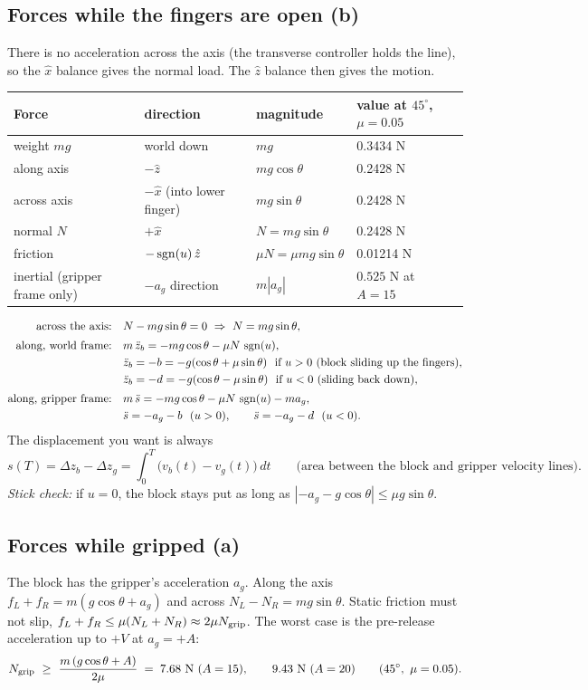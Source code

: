 \subsection*{Forces while the fingers are open (b)}
There is no acceleration across the axis (the transverse controller holds the line), so the $\hat x$ balance gives
the normal load. The $\hat z$ balance then gives the motion.
\begin{center}
\small
\begin{tabular}{llll}
\toprule
Force & direction & magnitude & value at $45^\circ$, $\mu=0.05$\\
\midrule
weight $mg$ & world down & $mg$ & 0.3434 N\\
\quad along axis & $-\hat z$ & $mg\cos\theta$ & 0.2428 N\\
\quad across axis & $-\hat x$ (into lower finger) & $mg\sin\theta$ & 0.2428 N\\
normal $N$ & $+\hat x$ & $N=mg\sin\theta$ & 0.2428 N\\
friction & $-\operatorname{sgn}(u)\,\hat z$ & $\mu N=\mu mg\sin\theta$ & 0.01214 N\\
inertial (gripper frame only) & $-a_g$ direction & $m|a_g|$ & $0.525$ N at $A=15$\\
\bottomrule
\end{tabular}
\end{center}
\begin{align*}
  \text{across the axis:}\quad & N - mg\sin\theta = 0 \ \Rightarrow\ N=mg\sin\theta,\\[2pt]
  \text{along, world frame:}\quad & m\,\ddot z_b = -mg\cos\theta - \mu N\,\sgn(u),\\
  & \ddot z_b=-b=-g(\cos\theta+\mu\sin\theta)\ \ \text{if } u>0\ \text{(block sliding up the fingers)},\\
  & \ddot z_b=-d=-g(\cos\theta-\mu\sin\theta)\ \ \text{if } u<0\ \text{(sliding back down)},\\[2pt]
  \text{along, gripper frame:}\quad & m\,\ddot s = -mg\cos\theta - \mu N\,\sgn(u) - m a_g,\\
  & \ddot s = -a_g - b\ \ (u>0),\qquad \ddot s=-a_g-d\ \ (u<0).
\end{align*}
The displacement you want is always
\[
  s(T)=\Delta z_b-\Delta z_g=\int_0^T\big(v_b(t)-v_g(t)\big)\,dt
  \qquad\text{(area between the block and gripper velocity lines).}
\]
\emph{Stick check:} if $u=0$, the block stays put as long as $|{-a_g}-g\cos\theta|\le\mu g\sin\theta$.

\subsection*{Forces while gripped (a)}
The block has the gripper's acceleration $a_g$. Along the axis
$f_L+f_R=m(g\cos\theta+a_g)$ and across $N_L-N_R=mg\sin\theta$. Static friction must not slip,
$f_L+f_R\le\mu(N_L+N_R)\approx2\mu N_{\rm grip}$. The worst case is the pre-release acceleration up to $+V$ at
$a_g=+A$:
\[
  N_{\rm grip}\ \ge\ \frac{m\,(g\cos\theta+A)}{2\mu}\;=\;7.68\ \text{N}\ (A=15),\qquad 9.43\ \text{N}\ (A=20)
  \qquad(45^\circ,\ \mu=0.05).
\]

